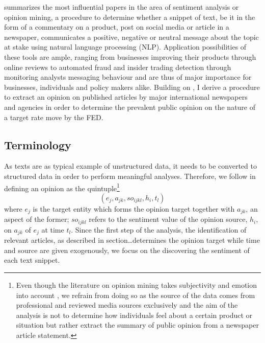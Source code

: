 
\textcite{Liu.2012} summarizes the most influential papers in the area of sentiment analysis or opinion mining, a procedure to determine whether a snippet of text, be it in the form of a commentary on a product, post on social media or article in a newspaper, communicates a positive, negative or neutral message about the topic at stake using natural language processing (NLP). Application possibilities of these tools are ample, ranging from businesses improving their products through online reviews to automated fraud and insider trading detection through monitoring analysts messaging behaviour and are thus of major importance for businesses, individuals and policy makers alike. 
Building on \textcite{Liu.2012}, 
I derive a procedure to extract an opinion on published articles by major international newspapers and agencies in order to determine the prevalent public opinion on the nature of a target rate move by the FED.

\subsection{Terminology}

As texts are as typical example of unstructured data, it needs to be converted to structured data in order to perform meaningful analyses. Therefore, we follow \textcite{Liu.2010} in defining an opinion as the quintuple\footnote{Even though the literature on opinion mining takes subjectivity and emotion into account \parencite{Wiebe.2000,Wiebe.2004,Riloff.2006}, we refrain from doing so as the source of the data comes from professional and reviewed media sources exclusively and the aim of the analysis is not to determine how individuals feel about a certain product or situation but rather extract the summary of public opinion from a newspaper article statement.} 
\begin{equation}
	(e_j, a_{jk}, so_{ijkl}, h_i, t_l)
\end{equation}
where $e_j$ is the target entity which forms the opinion target together with $a_{jk}$, an aspect of the former; $so_{ijkl}$ refers to the sentiment value of the opinion source, $h_i$, on $a_{jk}$ of $e_j$ at time $t_l$.
Since the first step of the analysis, the identification of relevant articles, as described in section\dots determines the opinion target while time and source are given exogenously, we focus on the discovering the sentiment of each text snippet. 

